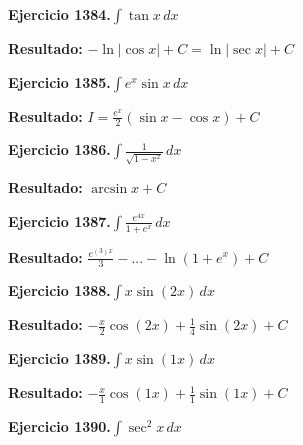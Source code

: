 \documentclass[10pt,a4paper]{article}
\begin{document}
\newpage
\begin{ejbox}
\textbf{Ejercicio 1384.}\quad $\int \tan x\,dx$
\end{ejbox}

\begin{solbox}
\textbf{Resultado:} \(\displaystyle -\ln|\cos x| + C = \ln|\sec x| + C\)
\end{solbox}

\begin{ejbox}
\textbf{Ejercicio 1385.}\quad $\int e^x\sin x\,dx$
\end{ejbox}

\begin{solbox}
\textbf{Resultado:} \(\displaystyle I = \frac{e^x}{2}(\sin x - \cos x) + C\)
\end{solbox}

\begin{ejbox}
\textbf{Ejercicio 1386.}\quad $\int \frac{1}{\sqrt{1-x^2}}\,dx$
\end{ejbox}

\begin{solbox}
\textbf{Resultado:} \(\displaystyle \arcsin x + C\)
\end{solbox}

\newpage
\begin{ejbox}
\textbf{Ejercicio 1387.}\quad $\int \frac{e^{4x}}{1+e^{x}}\,dx$
\end{ejbox}

\begin{solbox}
\textbf{Resultado:} \(\displaystyle \frac{e^{(3)x}}{3} - ... - \ln(1+e^x) + C\)
\end{solbox}

\begin{ejbox}
\textbf{Ejercicio 1388.}\quad $\int x \sin(2x)\,dx$
\end{ejbox}

\begin{solbox}
\textbf{Resultado:} \(\displaystyle -\frac{x}{2}\cos(2x) + \frac{1}{4}\sin(2x) + C\)
\end{solbox}

\begin{ejbox}
\textbf{Ejercicio 1389.}\quad $\int x \sin(1x)\,dx$
\end{ejbox}

\begin{solbox}
\textbf{Resultado:} \(\displaystyle -\frac{x}{1}\cos(1x) + \frac{1}{1}\sin(1x) + C\)
\end{solbox}

\newpage
\begin{ejbox}
\textbf{Ejercicio 1390.}\quad $\int \sec^2 x\,dx$
\end{ejbox}
\end{document}
